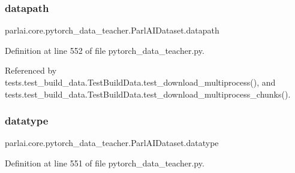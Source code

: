 \subsubsection{\texorpdfstring{datapath}{datapath}}
{\footnotesize\ttfamily parlai.\+core.\+pytorch\+\_\+data\+\_\+teacher.\+Parl\+A\+I\+Dataset.\+datapath}



Definition at line 552 of file pytorch\+\_\+data\+\_\+teacher.\+py.



Referenced by tests.\+test\+\_\+build\+\_\+data.\+Test\+Build\+Data.\+test\+\_\+download\+\_\+multiprocess(), and tests.\+test\+\_\+build\+\_\+data.\+Test\+Build\+Data.\+test\+\_\+download\+\_\+multiprocess\+\_\+chunks().

\mbox{\label{classparlai_1_1core_1_1pytorch__data__teacher_1_1ParlAIDataset_a05192273eccb2399271159c081f8a4fa}} 
\subsubsection{\texorpdfstring{datatype}{datatype}}
{\footnotesize\ttfamily parlai.\+core.\+pytorch\+\_\+data\+\_\+teacher.\+Parl\+A\+I\+Dataset.\+datatype}



Definition at line 551 of file pytorch\+\_\+data\+\_\+teacher.\+py.



